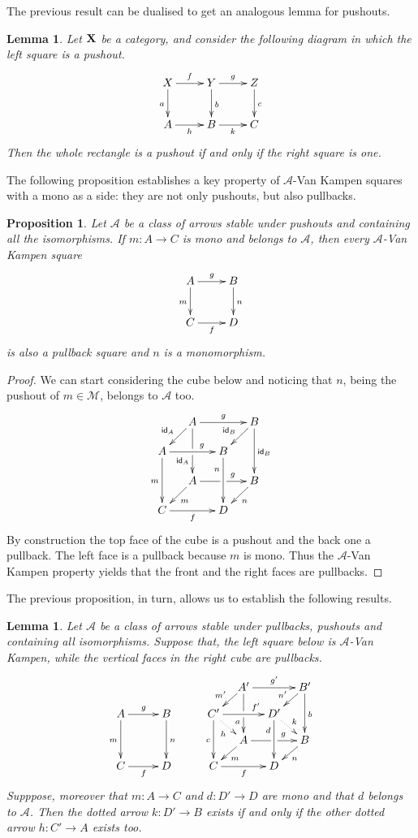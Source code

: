 \documentclass[a4paper]{article}
\newcommand{\id}[1]{\mathsf{id}_{#1}}
\def\C{\textbf {\textup{C}}}
\def\X{\textbf {\textup{X}}}
\newtheorem{proposition}[theorem]{Proposition}
\newtheorem{lemma}[theorem]{Lemma}
\theoremstyle{definition}
\begin{document}
The previous result can be dualised to get an analogous lemma for pushouts.

\begin{lemma}\label{lem:po1}
	Let $\X$ be a category, and consider the following diagram 	in which the left square is a pushout.
	\[\xymatrix{X \ar[d]_{a} \ar[r]^{f}& \ar[r]^{g} Y \ar[d]^{b}& Z \ar[d]^{c}\\ A \ar[r]_{h}& B \ar[r]_{k}& C}\]
	Then the whole rectangle is a pushout if and only if the right square is one.
\end{lemma}

The following proposition establishes a key property of $\mathcal{A}$-Van Kampen squares with a mono as a side: they are not only pushouts, but also pullbacks.
\begin{proposition}\label{prop:pbpo} Let $\mathcal{A}$ be a class of arrows stable under pushouts and containing all the isomorphisms.  If $m\colon A\to C$ is mono and belongs to $\mathcal{A}$, then every $\mathcal{A}$-Van Kampen square
	\[\xymatrix{A\ar[r]^{g} \ar[d]_{m} & B \ar[d]^{n} \\ C \ar[r]_{f}  & D}\]
	is also a pullback square and $n$ is a monomorphism.
\end{proposition}
\begin{proof} We can start considering the cube below and noticing that $n$, being the pushout of $m\in \mathcal{M}$, belongs to $\mathcal{A}$ too.
	\[\xymatrix@C=13pt@R=13pt{&A\ar[dd]|\hole_(.65){\id{A}}\ar[rr]^{g} \ar[dl]_{\id{A}} && B \ar[dd]^{\id{B}} \ar[dl]_{\id{B}} \\ A  \ar[dd]_{m}\ar[rr]^(.65){g} & & B \ar[dd]_(.3){n}\\&A\ar[rr]|\hole^(.65){g} \ar[dl]^{m} && B \ar[dl]^{n} \\C \ar[rr]_{f} & & D}\]
	By construction the top face of the cube is a pushout and the back one a pullback. The left face is a pullback because $m$ is mono. Thus the $\mathcal{A}$-Van Kampen property yields that the front and the right faces are pullbacks. 
\end{proof}

The previous proposition, in turn, allows us to establish the following results.
\begin{lemma}\label{lem:varie}Let $\mathcal{A}$ be a class of arrows stable under pullbacks, pushouts and containing all isomorphisms.  Suppose that, the left square below is $\mathcal{A}$-Van Kampen, while the vertical faces in the right cube are pullbacks.
		\[\xymatrix@C=10pt@R=10pt{&&&&&A'\ar[dd]|\hole_(.65){a}\ar[rr]^{g'} \ar[dl]_{m'} && B' \ar[dd]^{b} \ar[dl]_{n'} \\ A \ar[dd]_{m}\ar[rr]^{g}&&B\ar[dd]^{n}&&C'  \ar@{.>}[dr]_{h} _{}\ar[dd]_{c}\ar[rr]^(.7){f'} & & D' \ar@{.>}[dr]^{k}\ar[dd]_(.3){d}\\&&&&&A\ar[rr]|\hole^(.65){g} \ar[dl]^{m} && B \ar[dl]^{n} \\C\ar[rr]_{f} &&D&&C \ar[rr]_{f} & & D}\]
Supppose, moreover that $m\colon A\to C$ and $d\colon D'\to D$ are mono and that $d$ belongs to $\mathcal{A}$. Then the dotted arrow  $k\colon D'\to B$ exists if and only if the other dotted arrow  $h\colon C'\to A$ exists too.
\end{lemma}
\end{document}
